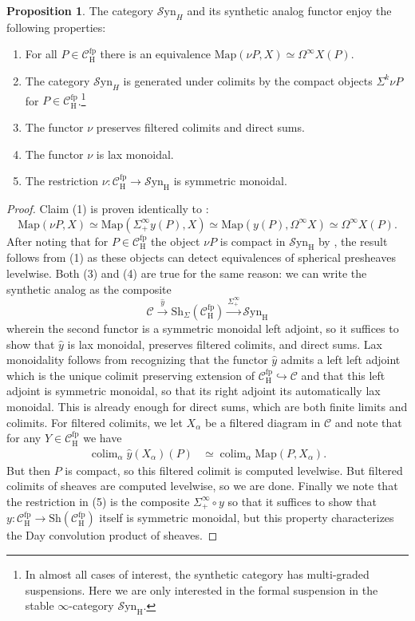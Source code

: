 \documentclass[10pt]{amsart}
\theoremstyle{definition}
\numberwithin{figure}{section}
\numberwithin{equation}{section}
\newtheorem{proposition}[figure]{Proposition}
\newcommand{\cC}{\mathcal{C}}
\theoremstyle{cited}
\newcommand{\colim}{\operatorname{colim}}
\newcommand{\Map}{\mathrm{Map}}
\newcommand{\Sh}{\mathrm{Sh}}
\newcommand{\fp}{\mathrm{fp}}
\newcommand{\Syn}{\mathcal{S}\mathrm{yn}}
\renewcommand{\H}{\mathrm{H}}
\begin{document}
\begin{proposition}
   The category $\Syn_H$ and its synthetic analog functor enjoy the following properties:
   \begin{enumerate}
    \item For all $P\in \cC_\H^\fp$ there is an equivalence $\Map(\nu P, X)\simeq \Omega^\infty X(P)$.
    \item The category $\Syn_H$ is generated under colimits by the compact objects $\Sigma^{k}\nu P$ for $P\in \cC_\H^\fp$.\footnote{In almost all cases of interest, the synthetic category has multi-graded suspensions. Here we are only interested in the formal suspension in the stable $\infty$-category $\Syn_\H$.}
    \item The functor $\nu$ preserves filtered colimits and direct sums.
    \item The functor $\nu$ is lax monoidal.
    \item The restriction $\nu:\cC_\H^\fp\to \Syn_\H$ is symmetric monoidal.
   \end{enumerate}  
\end{proposition}

\begin{proof}
  Claim (1) is proven identically to \cite[Lemma 4.11]{Pst22}:
  \[
  \Map(\nu P, X)\simeq \Map(\Sigma_+^\infty y(P), X)\simeq \Map(y(P), \Omega^\infty X)\simeq \Omega^\infty X(P).
  \]
  After noting that for $P\in \cC_\H^\fp$ the object $\nu P$ is compact in $\Syn_\H$ by \cite[Cor. 4.12]{Pst22}, the result follows from (1) as these objects can detect equivalences of spherical presheaves levelwise. Both (3) and (4) are true for the same reason: we can write the synthetic analog as the composite
  \[
  \cC\xrightarrow{\hat y} \Sh_\Sigma(\cC_\H^\fp) \xrightarrow{\Sigma_+^\infty}\Syn_\H
  \]
  wherein the second functor is a symmetric monoidal left adjoint, so it suffices to show that $\hat y$ is lax monoidal, preserves filtered colimits, and direct sums. Lax monoidality follows from recognizing that the functor $\hat y$ admits a left left adjoint which is the unique colimit preserving extension of $\cC^\fp_\H\hookrightarrow \cC$ and that this left adjoint is symmetric monoidal, so that its right adjoint its automatically lax monoidal. This is already enough for direct sums, which are both finite limits and colimits. For filtered colimits, we let $X_\alpha$ be a filtered diagram in $\cC$ and note that for any $Y\in \cC_\H^\fp$ we have
  \begin{align*}
    \colim_\alpha \hat y(X_\alpha)(P) & \simeq \colim_\alpha \Map(P, X_\alpha).
  \end{align*}
  But then $P$ is compact, so this filtered colimit is computed levelwise. But filtered colimits of sheaves are computed levelwise, so we are done. Finally we note that the restriction in (5) is the composite $\Sigma^\infty_+ \circ y$ so that it suffices to show that $y:\cC_\H^\fp\to \Sh(\cC_\H^\fp)$ itself is symmetric monoidal, but this property characterizes the Day convolution product of sheaves.
\end{proof}
\end{document}
